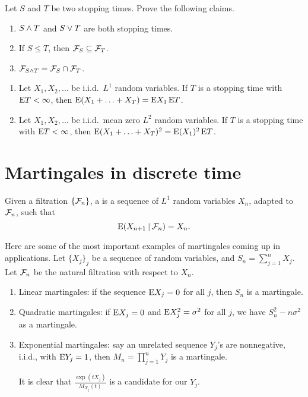 \begin{xca}
Let $S$ and $T$ be two stopping times. Prove the following claims.
    \begin{enumerate}
        \item $S\land T$ and $S \lor T$ are both stopping times.
        \item If $S \leq T$, then $\mathcal{F}_S \subseteq \mathcal{F}_T$.
        \item $\mathcal{F}_{S\land T} = \mathcal{F}_S \cap \mathcal{F}_T$.
    \end{enumerate}
\end{xca}

\begin{namedthm} \leavevmode
    \begin{enumerate}
        \item Let $X_1,X_2,\dotsc$ be i.i.d.\ $L^1$ random variables. If $T$ is a stopping time with $\mathop{}\!\mathrm{E} T<\infty$, then $\mathop{}\!\mathrm{E} (X_1 + \dotsc + X_T) = \mathop{}\!\mathrm{E} X_1 \mathop{}\!\mathrm{E} T$.
        \item Let $X_1,X_2,\dotsc$ be i.i.d.\ mean zero $L^2$ random variables.  If $T$ is a stopping time with $\mathop{}\!\mathrm{E} T<\infty$, then $\mathop{}\!\mathrm{E} (X_1 + \dotsc + X_T)^2 = \mathop{}\!\mathrm{E}(X_1)^2\mathop{}\!\mathrm{E} T$.
    \end{enumerate}
\end{namedthm}

\section{Martingales in discrete time}
Given a filtration $\{\mathcal{F}_n\}$, a  is a sequence of $L^1$ random variables $X_n$, adapted to $\mathcal{F}_n$, such that \[
    \mathop{}\!\mathrm{E}(X_{n+1}\mathbin{|} \mathcal{F}_n) = X_n.
\]

\begin{exa} Here are some of the most important examples of martingales coming up in applications. Let $\{X_j\}_j$ be a sequence of random variables, and $S_n = \sum_{j = 1}^n X_j$. Let $\mathcal{F}_n$ be the natural filtration with respect to $X_n$.
    \begin{enumerate}
        \item Linear martingales: if the sequence $\mathop{}\!\mathrm{E} X_j = 0$ for all $j$, then $S_n$ is a martingale.
        \item Quadratic martingales: if $\mathop{}\!\mathrm{E} X_j = 0$ and $\mathop{}\!\mathrm{E} X_j^2 = \sigma^2$ for all $j$, we have $S_n^2 - n\sigma^2$ as a martingale.
        \item Exponential martingales: say an unrelated sequence $Y_j$'s are nonnegative, i.i.d., with $\mathop{}\!\mathrm{E} Y_j = 1$, then $M_n = \prod_{j=1}^n Y_j$ is a martingale.

        It is clear that  $\frac{\exp(tX_j)}{M_{X_j}(t)}$ is a candidate for our $Y_j$.
    \end{enumerate}
\end{exa}

